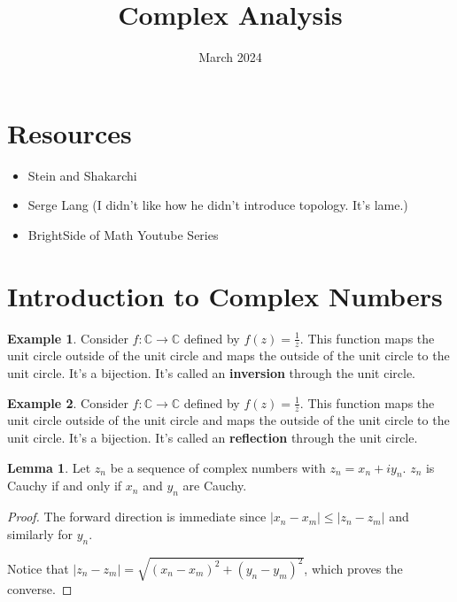\documentclass{article}
\title{Complex Analysis}
\date{March 2024}
\theoremstyle{definition}
\newtheorem{lemma}[theorem]{Lemma}
\newtheorem{example}{Example}[theorem]
\newcommand{\C}{\mathbb{C}}
\begin{document}
\maketitle

\section{Resources}

\begin{itemize}
    \item Stein and Shakarchi
    \item Serge Lang (I didn't like how he didn't introduce topology. It's lame.)
    \item BrightSide of Math Youtube Series
\end{itemize}

\section{Introduction to Complex Numbers}

\begin{example}
    Consider $f: \C \xrightarrow{} \C$ defined by $f(z) = \frac{1}{z}$. This function maps the unit circle outside of the unit circle
    and maps the outside of the unit circle to the unit circle. It's a bijection. It's called an \textbf{inversion} through the unit circle. 
\end{example}

\begin{example}
    Consider $f: \C \xrightarrow{} \C$ defined by $f(z) = \frac{1}{\bar{z}}$. This function maps the unit circle outside of the unit circle
    and maps the outside of the unit circle to the unit circle. It's a bijection. It's called an \textbf{reflection} through the unit circle. 
\end{example}

\begin{lemma}
    Let $z_{n}$ be a sequence of complex numbers with $z_{n} = x_{n} + i y_{n}$. $z_{n}$ is Cauchy if and only if
    $x_{n}$ and $y_{n}$ are Cauchy. 
\end{lemma}
\begin{proof}
    The forward direction is immediate since $\lvert x_{n} - x_{m} \rvert \leq \lvert z_{n} - z_{m} \rvert$ and similarly
    for $y_{n}$.

    Notice that $\lvert z_{n} - z_{m} \rvert = \sqrt{(x_{n} - x_{m})^{2} + (y_{n} - y_{m})^{2}}$, which proves the converse.
\end{proof}
\end{document}
